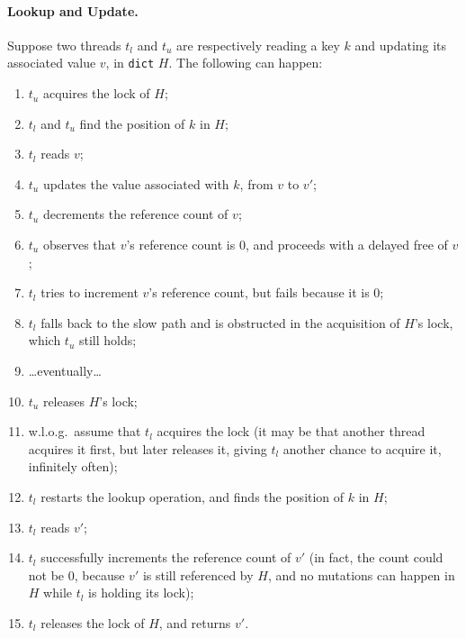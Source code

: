 \paragraph{Lookup and Update.}
Suppose two threads $t_l$ and $t_u$ are respectively reading a key $k$ and updating its associated value $v$, in \texttt{dict} $H$.
The following can happen:
\begin{enumerate}
	\item $t_u$ acquires the lock of $H$;
	\item $t_l$ and $t_u$ find the position of $k$ in $H$;
	\item $t_l$ reads $v$;
	\item $t_u$ updates the value associated with $k$, from $v$ to $v'$;
	\item $t_u$ decrements the reference count of $v$;
	\item $t_u$ observes that $v$'s reference count is 0, and proceeds with a delayed free of $v$;
	\item $t_l$ tries to increment $v$'s reference count, but fails because it is 0;
	\item $t_l$ falls back to the slow path and is obstructed in the acquisition of $H$'s lock, which $t_u$ still holds;
	\item {\ldots}eventually{\ldots}
	\item $t_u$ releases $H$'s lock;
	\item w.l.o.g.\ assume that $t_l$ acquires the lock (it may be that another thread acquires it first, but later releases it, giving $t_l$ another chance to acquire it, infinitely often);
	\item $t_l$ restarts the lookup operation, and finds the position of $k$ in $H$;
	\item $t_l$ reads $v'$;
	\item $t_l$ successfully increments the reference count of $v'$ (in fact, the count could not be 0, because $v'$ is still referenced by $H$, and no mutations can happen in $H$ while $t_l$ is holding its lock);
	\item $t_l$ releases the lock of $H$, and returns $v'$.
\end{enumerate}

